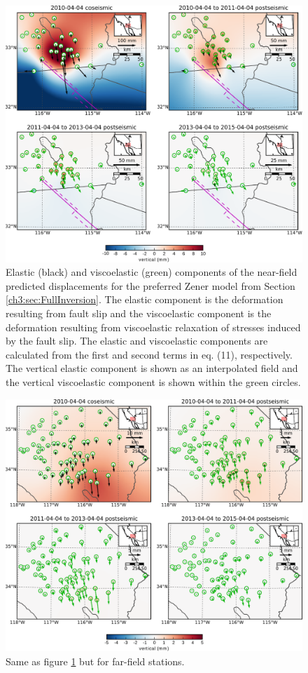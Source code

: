 \begin{figure}
\noindent\includegraphics[scale=1.0]{ch3/figures/2016jb013114-pS03}
\caption{Elastic (black) and viscoelastic (green) components of the
near-field predicted displacements for the preferred Zener model from
Section \ref{ch3:sec:FullInversion}.  The elastic component is the deformation resulting from
fault slip and the viscoelastic component is the deformation resulting
from viscoelastic relaxation of stresses induced by the fault slip.
The elastic and viscoelastic components are calculated from the first
and second terms in eq. (11), respectively.  The vertical elastic
component is shown as an interpolated field and the vertical
viscoelastic component is shown within the green circles.}
\label{ch3:fig:S3}
\end{figure}

\begin{figure}
\noindent\includegraphics[scale=1.0]{ch3/figures/2016jb013114-pS04}
\caption{Same as figure \ref{ch3:fig:S3} but for far-field stations.}
\label{ch3:fig:S4}
\end{figure}

